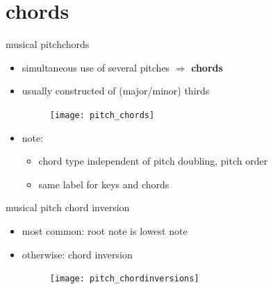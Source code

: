     \section{chords}
        \begin{frame}{musical pitch}{chords}
            \begin{itemize}
                \item	simultaneous use of several pitches $\Rightarrow$ \textbf{chords}
                \item	usually constructed of (major/minor) thirds
                \begin{figure}[t]
                    \centering
                    \texttt{[image: pitch\_chords]}
                \end{figure}
                
                \smallskip
                \item<2->	note:
                        \begin{itemize}
                            \item	chord type independent of pitch doubling, pitch order
                            \item	same label for keys and chords
                        \end{itemize}
            \end{itemize}
        \end{frame}
        
        \begin{frame}{musical pitch}{ chord inversion}
            \begin{itemize}
                \item	most common: root note is lowest note
                \item	otherwise: chord inversion
                \begin{figure}[t]
                    \centering
                    \texttt{[image: pitch\_chordinversions]}
                \end{figure}
                
            \end{itemize}
        \end{frame}
        

